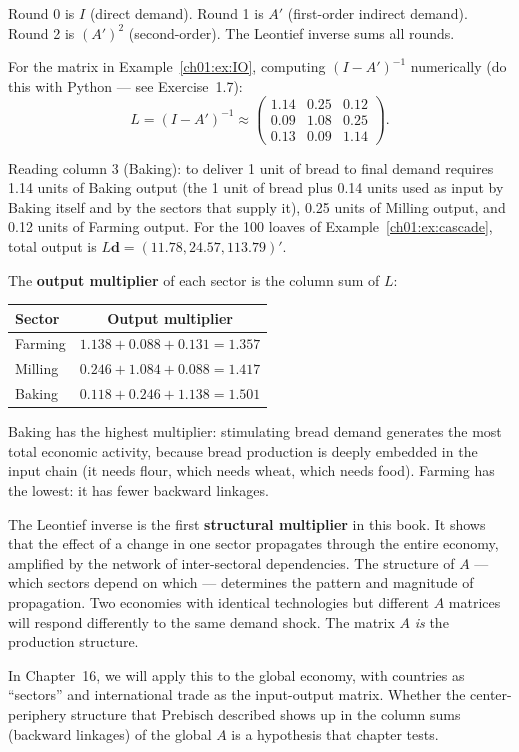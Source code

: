 \documentclass[../structural_economics_book.tex]{subfiles}
\begin{document}
Round 0 is $I$ (direct demand). Round 1 is $A'$ (first-order indirect demand). Round 2 is $(A')^2$ (second-order). The Leontief inverse sums all rounds.

\begin{example}\label{ch01:ex:leontief_numbers}
For the matrix in Example~\ref{ch01:ex:IO}, computing $(I - A')^{-1}$ numerically (do this with Python --- see Exercise~1.7):
\begin{equation}
L = (I - A')^{-1} \approx \begin{pmatrix} 1.14 & 0.25 & 0.12 \\ 0.09 & 1.08 & 0.25 \\ 0.13 & 0.09 & 1.14 \end{pmatrix}.
\end{equation}

Reading column 3 (Baking): to deliver 1 unit of bread to final demand requires 1.14 units of Baking output (the 1 unit of bread plus 0.14 units used as input by Baking itself and by the sectors that supply it), 0.25 units of Milling output, and 0.12 units of Farming output. For the 100 loaves of Example~\ref{ch01:ex:cascade}, total output is $L\mathbf{d} = (11.78, 24.57, 113.79)'$.

The \textbf{output multiplier} of each sector is the column sum of $L$:
\begin{center}
\begin{tabular}{lc}
\toprule
Sector & Output multiplier \\
\midrule
Farming & $1.138 + 0.088 + 0.131 = 1.357$ \\
Milling & $0.246 + 1.084 + 0.088 = 1.417$ \\
Baking & $0.118 + 0.246 + 1.138 = 1.501$ \\
\bottomrule
\end{tabular}
\end{center}

Baking has the highest multiplier: stimulating bread demand generates the most total economic activity, because bread production is deeply embedded in the input chain (it needs flour, which needs wheat, which needs food). Farming has the lowest: it has fewer backward linkages.
\end{example}

\begin{keyinsight}
The Leontief inverse is the first \textbf{structural multiplier} in this book. It shows that the effect of a change in one sector propagates through the entire economy, amplified by the network of inter-sectoral dependencies. The structure of $A$ --- which sectors depend on which --- determines the pattern and magnitude of propagation. Two economies with identical technologies but different $A$ matrices will respond differently to the same demand shock. The matrix $A$ \textit{is} the production structure.

In Chapter~16, we will apply this to the global economy, with countries as ``sectors'' and international trade as the input-output matrix. Whether the center-periphery structure that Prebisch described shows up in the column sums (backward linkages) of the global $A$ is a hypothesis that chapter tests.
\end{keyinsight}
\end{document}
